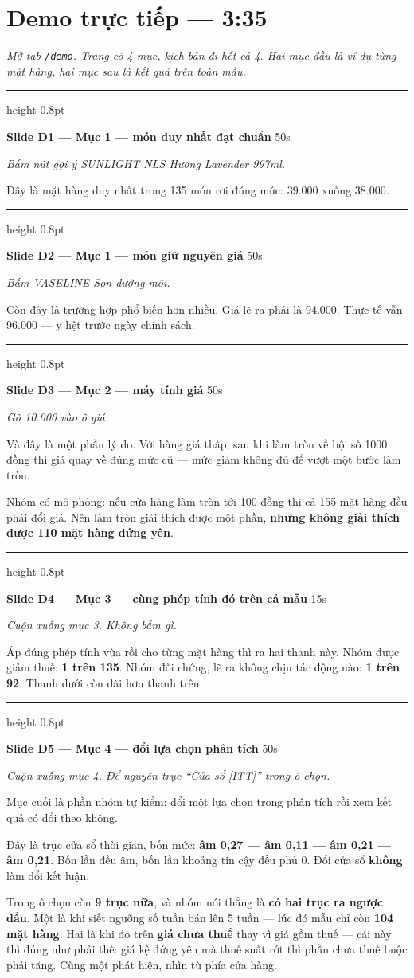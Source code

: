 \documentclass[12pt]{article}
\newcommand{\slidemuc}[4]{%
  \vspace{10pt}%
  {\color{vach}\hrule height 0.8pt}%
  \vspace{4pt}%
  {\large\bfseries Slide #1 — #2}%
  \hfill{\color{xam}\normalsize #3}%
  \ifx\relax#4\relax\else\\[2pt]{\bfseries\small #4}\fi%
  \vspace{4pt}\par%
}
\newenvironment{noi}%
  {\vspace{3pt}\begin{list}{}{%
     \setlength{\leftmargin}{14pt}\setlength{\rightmargin}{0pt}%
     \setlength{\itemindent}{0pt}\setlength{\listparindent}{0pt}%
     \setlength{\parsep}{5pt}}\item[]%
   \color{black}}%
  {\end{list}\vspace{2pt}}
\newcommand{\chidan}[1]{{\color{xam}\small\emph{#1}}\par}
\begin{document}
\section*{Demo trực tiếp --- 3:35}

\chidan{Mở tab \texttt{/demo}. Trang có 4 mục, kịch bản đi hết cả 4. Hai mục đầu là ví
dụ từng mặt hàng, hai mục sau là kết quả trên toàn mẫu.}

\slidemuc{D1}{Mục 1 --- món duy nhất đạt chuẩn}{50s}{\relax}
\chidan{Bấm nút gợi ý SUNLIGHT NLS Hương Lavender 997ml.}
\begin{noi}
Đây là mặt hàng duy nhất trong 135 món rơi đúng mức: 39.000 xuống 38.000.
\end{noi}

\slidemuc{D2}{Mục 1 --- món giữ nguyên giá}{50s}{\relax}
\chidan{Bấm VASELINE Son dưỡng môi.}
\begin{noi}
Còn đây là trường hợp phổ biến hơn nhiều. Giá lẽ ra phải là 94.000. Thực tế vẫn
96.000 --- y hệt trước ngày chính sách.
\end{noi}

\slidemuc{D3}{Mục 2 --- máy tính giá}{50s}{\relax}
\chidan{Gõ 10.000 vào ô giá.}
\begin{noi}
Và đây là một phần lý do. Với hàng giá thấp, sau khi làm tròn về bội số 1000 đồng
thì giá quay về đúng mức cũ --- mức giảm không đủ để vượt một bước làm tròn.

Nhóm có mô phỏng: nếu cửa hàng làm tròn tới 100 đồng thì cả 155 mặt hàng đều phải
đổi giá. Nên làm tròn giải thích được một phần, \textbf{nhưng không giải thích được
110 mặt hàng đứng yên}.
\end{noi}

\slidemuc{D4}{Mục 3 --- cùng phép tính đó trên cả mẫu}{15s}{\relax}
\chidan{Cuộn xuống mục 3. Không bấm gì.}
\begin{noi}
Áp đúng phép tính vừa rồi cho từng mặt hàng thì ra hai thanh này. Nhóm được giảm
thuế: \textbf{1 trên 135}. Nhóm đối chứng, lẽ ra không chịu tác động nào:
\textbf{1 trên 92}. Thanh dưới còn dài hơn thanh trên.
\end{noi}

\slidemuc{D5}{Mục 4 --- đổi lựa chọn phân tích}{50s}{\relax}
\chidan{Cuộn xuống mục 4. Để nguyên trục ``Cửa sổ [ITT]'' trong ô chọn.}
\begin{noi}
Mục cuối là phần nhóm tự kiểm: đổi một lựa chọn trong phân tích rồi xem kết quả có
đổi theo không.

Đây là trục cửa sổ thời gian, bốn mức: \textbf{âm 0,27 --- âm 0,11 --- âm 0,21 ---
âm 0,21}. Bốn lần đều âm, bốn lần khoảng tin cậy đều phủ 0. Đổi cửa sổ \textbf{không}
làm đổi kết luận.

Trong ô chọn còn \textbf{9 trục nữa}, và nhóm nói thẳng là \textbf{có hai trục ra
ngược dấu}. Một là khi siết ngưỡng số tuần bán lên 5 tuần --- lúc đó mẫu chỉ còn
\textbf{104 mặt hàng}. Hai là khi đo trên \textbf{giá chưa thuế} thay vì giá gồm thuế
--- cái này thì đúng như phải thế: giá kệ đứng yên mà thuế suất rớt thì phần chưa
thuế buộc phải tăng. Cùng một phát hiện, nhìn từ phía cửa hàng.
\end{noi}
\end{document}
